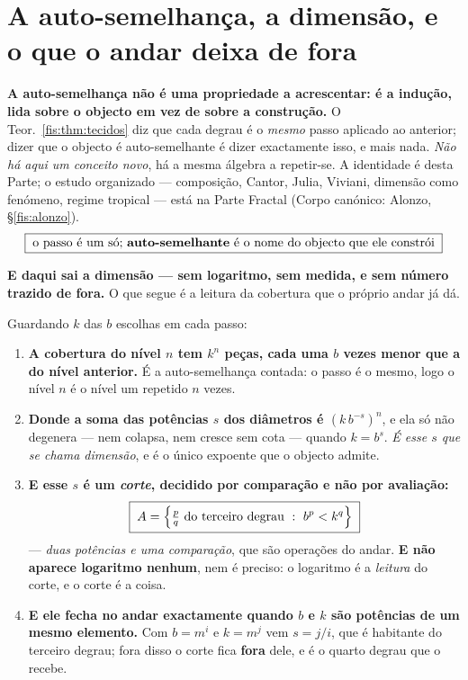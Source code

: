 \documentclass[livro.tex]{subfiles}
\begin{document}
\section{A auto-semelhança, a dimensão, e o que o andar deixa de fora}\label{fis:fractal}

\noindent\textbf{A auto-semelhança não é uma propriedade a acrescentar: é a
indução, lida sobre o objecto em vez de sobre a construção.} O
Teor.~\ref{fis:thm:tecidos} diz que cada degrau é o \emph{mesmo} passo aplicado
ao anterior; dizer que o objecto é auto-semelhante é dizer exactamente isso, e
mais nada. \emph{Não há aqui um conceito novo}, há a mesma álgebra a repetir-se.
A identidade é desta Parte; o estudo organizado --- composição, Cantor, Julia,
Viviani, dimensão como fenómeno, regime tropical --- está na Parte Fractal
(Corpo canónico: Alonzo, §\ref{fis:alonzo}).
\[
\boxed{\;\text{o passo é um só; \textbf{auto-semelhante} é o nome do objecto que ele constrói}\;}
\]

\medskip\noindent\textbf{E daqui sai a dimensão --- sem logaritmo, sem medida, e
sem número trazido de fora.} O que segue é a leitura da cobertura que o próprio
andar já dá.

\begin{teorema}\label{fis:thm:dimcorte}
Guardando $k$ das $b$ escolhas em cada passo:
\begin{enumerate}\itemsep3pt
\item[(1)] \textbf{A cobertura do nível $n$ tem $k^{n}$ peças, cada uma $b$ vezes
menor que a do nível anterior.} É a auto-semelhança contada: o passo é o mesmo,
logo o nível $n$ é o nível um repetido $n$ vezes.
\item[(2)] \textbf{Donde a soma das potências $s$ dos diâmetros é
$(k\,b^{-s})^{n}$}, e ela só não degenera --- nem colapsa, nem cresce sem cota
--- quando $k=b^{s}$. \emph{É esse $s$ que se chama dimensão}, e é o único
expoente que o objecto admite.
\item[(3)] \textbf{E esse $s$ é um \emph{corte}, decidido por comparação e não
por avaliação:}
\[
\boxed{\;A=\Bigl\{\tfrac{p}{q}\ \text{do terceiro degrau}\ :\ b^{p}<k^{q}\Bigr\}\;}
\]
--- \emph{duas potências e uma comparação}, que são operações do andar. \textbf{E
não aparece logaritmo nenhum}, nem é preciso: o logaritmo é a \emph{leitura} do
corte, e o corte é a coisa.
\item[(4)] \textbf{E ele fecha no andar exactamente quando $b$ e $k$ são
potências de um mesmo elemento.} Com $b=m^{i}$ e $k=m^{j}$ vem $s=j/i$, que é
habitante do terceiro degrau; fora disso o corte fica \textbf{fora} dele, e é o
quarto degrau que o recebe.
\end{enumerate}
\end{teorema}
\end{document}
